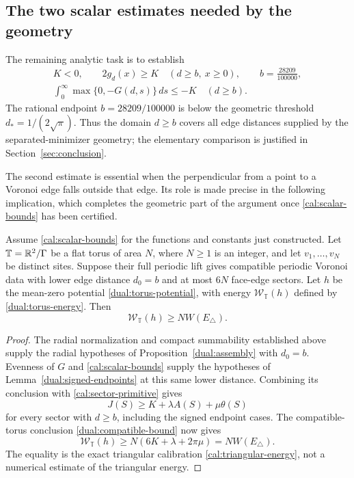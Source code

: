 \subsection{The two scalar estimates needed by the geometry}
The remaining analytic task is to establish
\begin{equation}\label{cal:scalar-bounds}
 \begin{gathered}
 K<0,\qquad 2g_d(x)\ge K\quad(d\ge b,\ x\ge0),\qquad b=\frac{28209}{100000},\\
 \int_0^\infty\max\{0,-G(d,s)\}\,ds\le-K\quad(d\ge b).
 \end{gathered}
\end{equation}
The rational endpoint $b=28209/100000$ is below the geometric
threshold $d_*=1/(2\sqrt\pi)$. Thus the domain $d\ge b$ covers all
edge distances supplied by the separated-minimizer geometry; the
elementary comparison is justified in Section~\ref{sec:conclusion}.

The second estimate is essential when the perpendicular from a point
to a Voronoi edge falls outside that edge.  Its role is made precise
in the following implication, which completes the geometric part of
the argument once \eqref{cal:scalar-bounds} has been certified.

\begin{proposition}\label{cal:scalar-to-torus}
Assume \eqref{cal:scalar-bounds} for the functions and constants just
constructed.  Let $\mathbb T=\mathbb R^2/\Gamma$ be a flat torus of area $N$,
where $N\ge1$ is an integer, and let $v_1,\ldots,v_N$ be distinct
sites.  Suppose their full periodic lift gives compatible periodic
Voronoi data with lower edge distance $d_0=b$ and at most $6N$
face-edge sectors.  Let $h$ be the mean-zero potential
\eqref{dual:torus-potential}, with energy
$\mathcal W_{\mathbb T}(h)$ defined by \eqref{dual:torus-energy}.
Then
\[
 \mathcal W_{\mathbb T}(h)\ge NW(E_\triangle).
\]
\end{proposition}
\begin{proof}
The radial normalization and compact summability established above
supply the radial hypotheses of Proposition~\ref{dual:assembly}
with $d_0=b$.  Evenness of $G$ and \eqref{cal:scalar-bounds} supply
the hypotheses of Lemma~\ref{dual:signed-endpoints} at this same
lower distance.  Combining its conclusion with
\eqref{cal:sector-primitive} gives
\[
 J(S)\ge K+\lambda A(S)+\mu\theta(S)
\]
for every sector with $d\ge b$, including the signed endpoint cases.
The compatible-torus conclusion \eqref{dual:compatible-bound} now gives
\[
 \mathcal W_{\mathbb T}(h)\ge N(6K+\lambda+2\pi\mu)
                         =NW(E_\triangle).
\]
The equality is the exact triangular calibration
\eqref{cal:triangular-energy}, not a numerical estimate of the
triangular energy.
\end{proof}
